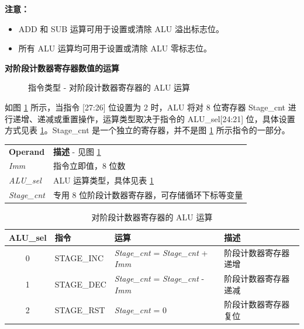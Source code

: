 \documentclass[main\_\_CN.tex]{subfiles}
\begin{document}
\vspace{-2em}
\textbf{注意：}
\begin{itemize}
    \item ADD 和 SUB 运算可用于设置或清除 ALU 溢出标志位。
    \item 所有 ALU 运算均可用于设置或清除 ALU 零标志位。
\end{itemize}


\clearpage
\textcolor{istcolor}{\textbf{ 对阶段计数器寄存器数值的运算}}\label{sec:alu-cnt}

%
%
%
%
%
%
%
\begin{figure}[H]
    \centering
    \caption{指令类型 - 对阶段计数器寄存器的 ALU 运算}
    \label{fig:ALU-with-stage-count}
\end{figure}

如图 \ref{fig:ALU-with-stage-count} 所示，当指令 [27:26] 位设置为 2 时，ALU 将对 8 位寄存器 Stage\_cnt 进行递增、递减或重置操作，运算类型取决于指令的 ALU\_sel[24:21] 位，具体设置方式见表 \ref{fig:ALU-with-stage-count}。Stage\_cnt 是一个独立的寄存器，并不是图 \ref{fig:ALU-with-stage-count} 所示指令的一部分。

\begin{tabular}{ l l }
\textbf{Operand} & \textbf{描述} - 见图 \ref{fig:ALU-with-stage-count} \\
\textit{Imm} & 指令立即值，8 位数 \\
\textit{ALU\_sel} & ALU 运算类型，具体见表 \ref{tab:ALU-with-stage-count}\\
\textit{Stage\_cnt} & 专用 8 位阶段计数器寄存器，可存储循环下标等变量
\end{tabular}


\begin{table}[H]
    \centering
    \begin{tabular}{ c l l l }
    \textbf{ALU\_sel} & \textbf{指令} & \textbf{运算} & \textbf{描述} \\ \hline
    0 & STAGE\_INC & \textit{Stage\_cnt} = \textit{Stage\_cnt} + \textit{Imm} & 阶段计数器寄存器递增 \\
    1 & STAGE\_DEC & \textit{Stage\_cnt} = \textit{Stage\_cnt} - \textit{Imm} & 阶段计数器寄存器递减 \\
    2 & STAGE\_RST & \textit{Stage\_cnt} = 0 & 阶段计数器寄存器复位
    \end{tabular}
    \caption{对阶段计数器寄存器的 ALU 运算}
    \label{tab:ALU-with-stage-count}
\end{table}
\end{document}
